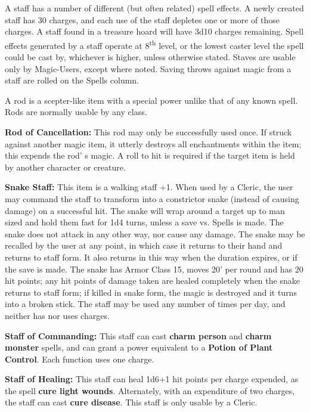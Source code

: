 \documentclass[a4paper,twoside,openany,10pt]{book}
\begin{document}
\begin{multicols}{2}
A staff has a number of different (but often related) spell effects. A newly created staff has 30 charges, and each use of the staff depletes one or more of those charges. A staff found in a treasure hoard will have 3d10 charges remaining. Spell effects generated by a staff operate at 8\textsuperscript{th} level, or the lowest caster level the spell could be cast by, whichever is higher, unless otherwise stated. Staves are usable only by Magic-Users, except where noted. Saving throws against magic from a staff are rolled on the Spells column.

A rod is a scepter-like item with a special power unlike that of any known spell. Rods are normally usable by any class.

\textbf{Rod of Cancellation:} This rod may only be successfully used once. If struck against another magic item, it utterly destroys all enchantments within the item; this expends the rod' s magic. A roll to hit is required if the target item is held by another character or creature.

\textbf{Snake Staff:} This item is a walking staff +1. When used by a Cleric, the user may command the staff to transform into a constrictor snake (instead of causing damage) on a successful hit. The snake will wrap around a target up to man sized and hold them fast for 1d4 turns, unless a save vs. Spells is made. The snake does not attack in any other way, nor cause any damage. The snake may be recalled by the user at any point, in which case it returns to their hand and returns to staff form. It also returns in this way when the duration expires, or if the save is made. The snake has Armor Class 15, moves 20' per round and has 20 hit points; any hit points of damage taken are healed completely when the snake returns to staff form; if killed in snake form, the magic is destroyed and it turns into a broken stick. The staff may be used any number of times per day, and neither has nor uses charges.

\textbf{Staff of Commanding:} This staff can cast \textbf{charm person} and \textbf{charm monster }spells, and can grant a power equivalent to a \textbf{Potion of Plant Control}. Each function uses one charge.

\textbf{Staff of Healing:} This staff can heal 1d6+1 hit points per charge expended, as the spell \textbf{cure light wounds}. Alternately, with an expenditure of two charges, the staff can cast \textbf{cure disease}. This staff is only usable by a Cleric.


\end{multicols}
\end{document}
